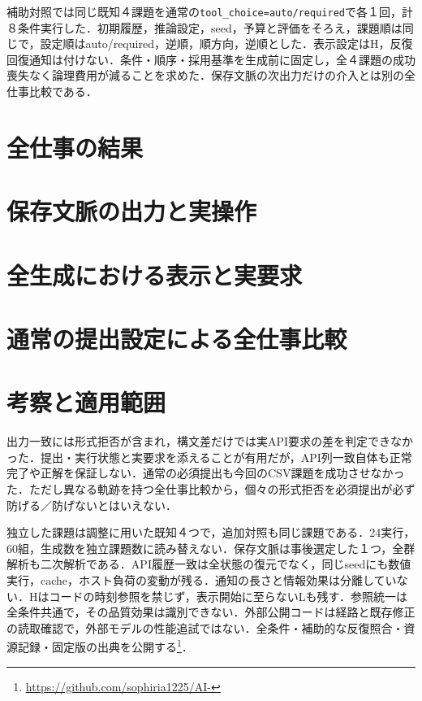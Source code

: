 \documentclass[uplatex,a4paper,twocolumn,10pt]{jsarticle}
\begin{document}
補助対照では同じ既知４課題を通常の\texttt{tool\_choice=auto/required}で各１回，計８条件実行した．初期履歴，推論設定，seed，予算と評価をそろえ，課題順は同じで，設定順はauto/required，逆順，順方向，逆順とした．表示設定はH，反復回復通知は付けない．条件・順序・採用基準を生成前に固定し，全４課題の成功喪失なく論理費用が減ることを求めた．保存文脈の次出力だけの介入とは別の全仕事比較である．

\section{全仕事の結果}



\section{保存文脈の出力と実操作}


\section{全生成における表示と実要求}


\section{通常の提出設定による全仕事比較}


\section{考察と適用範囲}
出力一致には形式拒否が含まれ，構文差だけでは実API要求の差を判定できなかった．提出・実行状態と実要求を添えることが有用だが，API列一致自体も正常完了や正解を保証しない．通常の必須提出も今回のCSV課題を成功させなかった．ただし異なる軌跡を持つ全仕事比較から，個々の形式拒否を必須提出が必ず防げる／防げないとはいえない．

独立した課題は調整に用いた既知４つで，追加対照も同じ課題である．24実行，60組，生成数を独立課題数に読み替えない．保存文脈は事後選定した１つ，全群解析も二次解析である．API履歴一致は全状態の復元でなく，同じseedにも数値実行，cache，ホスト負荷の変動が残る．通知の長さと情報効果は分離していない．Hはコードの時刻参照を禁じず，表示開始に至らないLも残す．参照統一は全条件共通で，その品質効果は識別できない．外部公開コードは経路と既存修正の読取確認で，外部モデルの性能追試ではない．全条件・補助的な反復照合・資源記録・固定版の出典を公開する\footnote{\url{https://github.com/sophiria1225/AI-}}．
\end{document}

